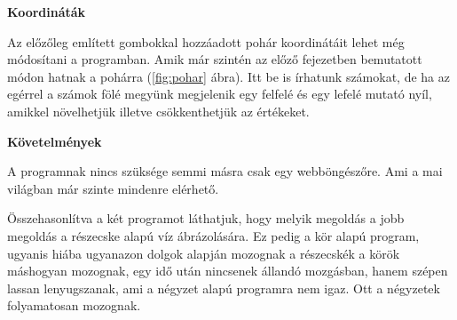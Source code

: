 \textbf{Koordináták}

Az előzőleg említett gombokkal hozzáadott pohár koordinátáit lehet még módosítani a programban. Amik már szintén az előző fejezetben bemutatott módon hatnak a pohárra (\ref{fig:pohar} ábra). Itt be is írhatunk számokat, de ha az egérrel a számok fölé megyünk megjelenik egy felfelé és egy lefelé mutató nyíl, amikkel növelhetjük illetve csökkenthetjük az értékeket. 

\textbf{Követelmények}

A programnak nincs szüksége semmi másra csak egy webböngészőre. Ami a mai világban már szinte mindenre elérhető. 


Összehasonlítva a két programot láthatjuk, hogy melyik megoldás a jobb megoldás a részecske alapú víz ábrázolására. Ez pedig a kör alapú program, ugyanis hiába ugyanazon dolgok alapján mozognak a részecskék a körök máshogyan mozognak, egy idő után nincsenek állandó mozgásban, hanem szépen lassan lenyugszanak, ami a négyzet alapú programra nem igaz. Ott a négyzetek folyamatosan mozognak.
